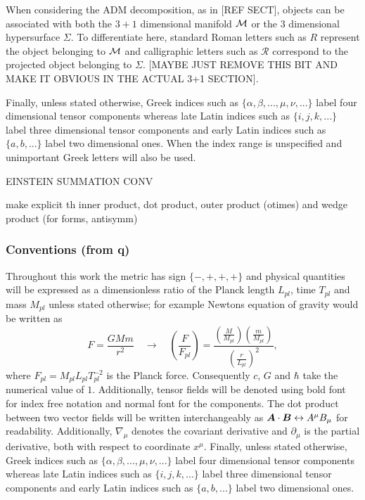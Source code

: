 When considering the ADM decomposition, as in [REF SECT], objects can be associated with both the $3+1$ dimensional manifold $\mathcal{M}$ or the $3$ dimensional hypersurface $\Sigma$. To differentiate here, standard Roman letters such as $R$ represent the object belonging to $\mathcal{M}$ and calligraphic letters such as $\mathcal{R}$ correspond to the projected object belonging to $\Sigma$. [MAYBE JUST REMOVE THIS BIT AND MAKE IT OBVIOUS IN THE ACTUAL 3+1 SECTION].

Finally, unless stated otherwise, Greek indices such
as $\{\alpha, \beta, ..., \mu, \nu, ...\}$ label four dimensional tensor components whereas late Latin indices such as $\{i, j, k, ...\}$ label
three dimensional tensor components and early Latin indices such as $\{a, b, ...\}$ label two dimensional ones. When the index range is unspecified and unimportant Greek letters will also be used.

EINSTEIN SUMMATION CONV

make explicit th inner product, dot product, outer product (otimes) and wedge product (for forms, antisymm)

\subsubsection*{Conventions (from q)}

Throughout this work the metric has sign $\{-,+,+,+\}$ and physical quantities will be expressed as a dimensionless ratio of the Planck length $L_{pl}$, time $T_{pl}$ and mass $M_{pl}$ unless stated otherwise; for example Newtons equation of gravity would be written as
\begin{equation}
F=\frac{GMm}{r^2} \quad \rightarrow \quad\left(\frac{F}{F_{pl}}\right) = \frac{\left(\frac{M}{M_{pl}}\right)  \left(\frac{m}{M_{pl}}\right)}{\left(\frac{r}{L_{pl}}\right)^2},
\end{equation}
where $F_{pl} = M_{pl}L_{pl}T_{pl}^{-2}$ is the Planck force. Consequently $c$, $G$ and $\hbar$ take the numerical value of $1$. Additionally, tensor fields will be denoted using bold font for index free notation and normal font for the components. The dot product between two vector fields will be written interchangeably as $\boldsymbol{A}\cdot\boldsymbol{B}\leftrightarrow A^\mu B_\mu$ for readability. Additionally, $\nabla_\mu$ denotes the covariant derivative and $\partial_\mu$ is the partial derivative, both with respect to coordinate $x^\mu$. Finally, unless stated otherwise, Greek indices such as $\{\alpha, \beta, ..., \mu, \nu, ... \}$ label four dimensional tensor components whereas late Latin indices such as $\{i,j,k,...\}$ label three dimensional tensor components and early Latin indices such as $\{a,b,...\}$ label two dimensional ones.

